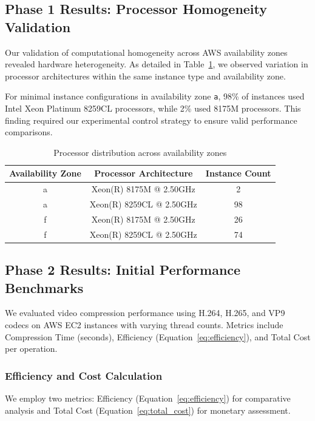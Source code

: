 \documentclass[conference]{IEEEtran}
\begin{document}
	\subsection{Phase 1 Results: Processor Homogeneity Validation}
	\label{results-phase1}
	
	Our validation of computational homogeneity across AWS availability zones revealed hardware heterogeneity. As detailed in Table~\ref{tab:processors}, we observed variation in processor architectures within the same instance type and availability zone.
	
	For minimal instance configurations in availability zone \texttt{a}, 98\% of instances used Intel Xeon Platinum 8259CL processors, while 2\% used 8175M processors. This finding required our experimental control strategy to ensure valid performance comparisons.
	
	\begin{table}[htbp]
		\centering
		\caption{Processor distribution across availability zones}
		\label{tab:processors}
		\begin{tabular}{|c|c|c|}
			\hline
			Availability Zone & Processor Architecture & Instance Count \\ \hline
			a & Xeon(R) 8175M @ 2.50GHz & 2 \\ \hline
			a & Xeon(R) 8259CL @ 2.50GHz & 98 \\ \hline
			f & Xeon(R) 8175M @ 2.50GHz & 26 \\ \hline
			f & Xeon(R) 8259CL @ 2.50GHz & 74 \\ \hline
		\end{tabular}
	\end{table}
	
	\subsection{Phase 2 Results: Initial Performance Benchmarks}
	\label{results-phase2}
	
	We evaluated video compression performance using H.264, H.265, and VP9 codecs on AWS EC2 instances with varying thread counts. Metrics include Compression Time (seconds), Efficiency (Equation~\ref{eq:efficiency}), and Total Cost per operation.
	
	\subsubsection{Efficiency and Cost Calculation}
	\label{efficiency-calculation}
	
	We employ two metrics: Efficiency (Equation~\ref{eq:efficiency}) for comparative analysis and Total Cost (Equation~\ref{eq:total_cost}) for monetary assessment.
	
\end{document}
